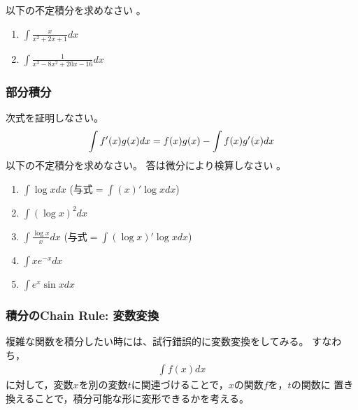 \documentclass[twocolumn,11pt]{jarticle}
\begin{document}
\exercise
以下の不定積分を求めなさい
。
\begin{enumerate}
\item \label{iitem:x/(x^x+2x+1)}$\displaystyle\int\frac{x}{x^2+2x+1}dx$
\item \label{iitem:1/(x^3-8x^2+20x-16)}$\displaystyle\int\frac{1}{x^3-8x^2+20x-16}dx$
\end{enumerate}

\subsubsection{部分積分}
\question
次式を証明しなさい。
\begin{align}
  \int f'(x)g(x)dx = f(x)g(x)-\int f(x)g'(x)dx\notag
\end{align}
\exercise
以下の不定積分を求めなさい。
答は微分により検算しなさい
。
\begin{enumerate}
\item \label{item:logx}$\displaystyle\int \log x dx$
  \quad(与式$=\int(x)'\log x dx$)
\item \label{item:(logx)2}$\displaystyle\int (\log x)^2 dx$
\item \label{item:logx/x}$\displaystyle\int \frac{\log x}{x}dx$
  \quad(与式$=\int(\log x)'\log x dx$)
\item \label{item:xe-x}$\displaystyle\int xe^{-x} dx$
\item \label{item:e2sinx}$\displaystyle\int e^x\sin x dx$
\end{enumerate}

\subsubsection{積分のChain Rule: 変数変換}
複雑な関数を積分したい時には、試行錯誤的に変数変換をしてみる。
すなわち，
\begin{align*}
  \int f(x)dx
\end{align*}
に対して，変数$x$を別の変数$t$に関連づけることで，$x$の関数$f$を，$t$の関数に
置き換えることで，積分可能な形に変形できるかを考える。
\end{document}
